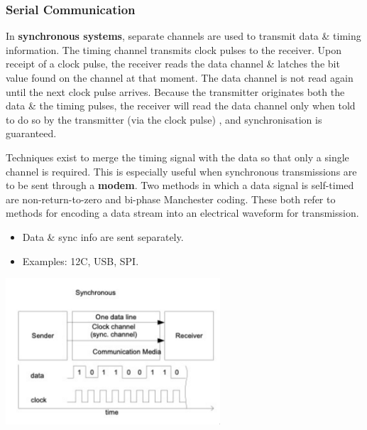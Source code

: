 \documentclass[11pt]{article}
\begin{document}
\subsubsection{Serial Communication} 
In \textbf{synchronous systems}, separate channels are used to transmit data \& timing information. 
The timing channel transmits clock pulses to the receiver. 
Upon receipt of a clock pulse, the receiver reads the data channel \& latches the bit value found on the channel at that moment. 
The data channel is not read again until the next clock pulse arrives. 
Because the transmitter originates both the data \& the timing pulses, the receiver will read the data channel only when 
told to do so by the transmitter (via the clock pulse) , and synchronisation is guaranteed.

Techniques exist to merge the timing signal with the data so that only a single channel is required. 
This is especially useful when synchronous transmissions are to be sent through a \textbf{modem}. 
Two methods in which a data signal is self-timed are non-return-to-zero and bi-phase Manchester coding. 
These both refer to methods for encoding a data stream into an electrical waveform for transmission. 
\begin{itemize}
    \item   Data \& sync info are sent separately. 
    \item   Examples: 12C, USB, SPI. 
\end{itemize}

\begin{center}
    \includegraphics[width=0.6\textwidth]{serialsynch.png}
\end{center}
\end{document}
